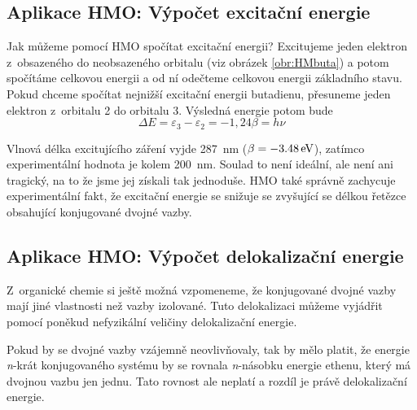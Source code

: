  
\subsection{Aplikace HMO: Výpočet excitační energie}

Jak můžeme pomocí HMO spočítat excitační energii? Excitujeme jeden elektron z~obsazeného do neobsazeného orbitalu (viz obrázek \ref{obr:HMbuta}) a potom spočítáme celkovou energii a od ní odečteme celkovou energii základního stavu. Pokud chceme spočítat nejnižší excitační energii butadienu, přesuneme jeden elektron z~orbitalu 2 do orbitalu 3. Výsledná energie potom bude
\begin{equation}
\Delta E = \varepsilon_3-\varepsilon_2 = -1{,}24 \beta = h\nu 
\end{equation}

Vlnová délka excitujícího záření vyjde \SI{287}{\nm} ($\beta = -\SI{3{,}48}{\eV}$), zatímco experimentální hodnota je kolem \SI{200}{\nm}.
Soulad to není ideální, ale není ani tragický, na to že jsme jej získali tak jednoduše. HMO také správně zachycuje experimentální fakt, že excitační energie se snižuje se zvyšující se délkou řetězce obsahující konjugované dvojné vazby.



\subsection{Aplikace HMO: Výpočet delokalizační energie}

Z~organické chemie si ještě možná vzpomeneme, že konjugované dvojné vazby mají jiné vlastnosti než vazby izolované.
Tuto delokalizaci můžeme vyjádřit pomocí poněkud nefyzikální veličiny delokalizační energie.

Pokud by se dvojné vazby vzájemně neovlivňovaly, tak by mělo platit, že  energie
\textit{n}-krát konjugovaného systému by se rovnala \textit{n}-násobku energie ethenu, který má dvojnou vazbu jen jednu. Tato rovnost ale neplatí a rozdíl je právě delokalizační energie. 

